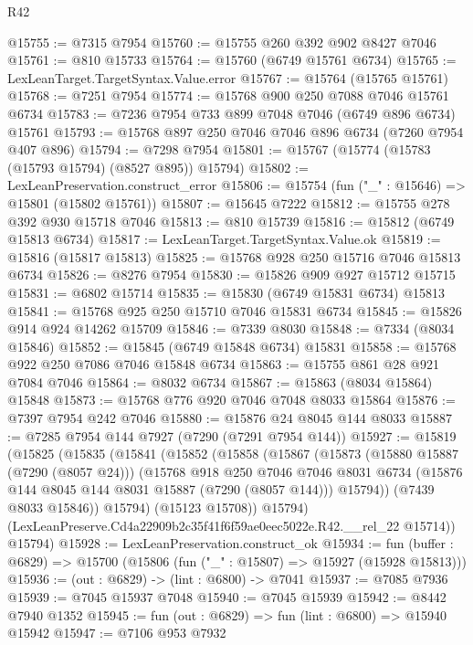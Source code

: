 \begin{lexlean}{R42}
\begin{coremodule}
{@15755 := @7315 @7954
@15760 := @15755 @260 @392 @902 @8427 @7046
@15761 := @810 @15733
@15764 := @15760 (@6749 @15761 @6734)
@15765 := LexLeanTarget.TargetSyntax.Value.error
@15767 := @15764 (@15765 @15761)
@15768 := @7251 @7954
@15774 := @15768 @900 @250 @7088 @7046 @15761 @6734
@15783 := @7236 @7954 @733 @899 @7048 @7046 (@6749 @896 @6734) @15761
@15793 := @15768 @897 @250 @7046 @7046 @896 @6734 (@7260 @7954 @407 @896)
@15794 := @7298 @7954
@15801 := @15767 (@15774 (@15783 (@15793 @15794) (@8527 @895)) @15794)
@15802 := LexLeanPreservation.construct_error
@15806 := @15754 (fun ("_" : @15646) => @15801 (@15802 @15761))
@15807 := @15645 @7222
@15812 := @15755 @278 @392 @930 @15718 @7046
@15813 := @810 @15739
@15816 := @15812 (@6749 @15813 @6734)
@15817 := LexLeanTarget.TargetSyntax.Value.ok
@15819 := @15816 (@15817 @15813)
@15825 := @15768 @928 @250 @15716 @7046 @15813 @6734
@15826 := @8276 @7954
@15830 := @15826 @909 @927 @15712 @15715
@15831 := @6802 @15714
@15835 := @15830 (@6749 @15831 @6734) @15813
@15841 := @15768 @925 @250 @15710 @7046 @15831 @6734
@15845 := @15826 @914 @924 @14262 @15709
@15846 := @7339 @8030
@15848 := @7334 (@8034 @15846)
@15852 := @15845 (@6749 @15848 @6734) @15831
@15858 := @15768 @922 @250 @7086 @7046 @15848 @6734
@15863 := @15755 @861 @28 @921 @7084 @7046
@15864 := @8032 @6734
@15867 := @15863 (@8034 @15864) @15848
@15873 := @15768 @776 @920 @7046 @7048 @8033 @15864
@15876 := @7397 @7954 @242 @7046
@15880 := @15876 @24 @8045 @144 @8033
@15887 := @7285 @7954 @144 @7927 (@7290 (@7291 @7954 @144))
@15927 := @15819
    (@15825
      (@15835
        (@15841
          (@15852
            (@15858
              (@15867
                (@15873
                  (@15880 @15887 (@7290 (@8057 @24)))
                  (@15768
                    @918
                    @250
                    @7046
                    @7046
                    @8031
                    @6734
                    (@15876 @144 @8045 @144 @8031 @15887 (@7290 (@8057 @144)))
                    @15794))
                (@7439 @8033 @15846))
              @15794)
            (@15123 @15708))
          @15794)
        (LexLeanPreserve.Cd4a22909b2c35f41f6f59ae0eec5022e.R42.__rel_22 @15714))
      @15794)
@15928 := LexLeanPreservation.construct_ok
@15934 := fun (buffer : @6829) => @15700 (@15806 (fun ("_" : @15807) => @15927 (@15928 @15813)))
@15936 := (out : @6829) -> (lint : @6800) -> @7041
@15937 := @7085 @7936
@15939 := @7045 @15937 @7048
@15940 := @7045 @15939
@15942 := @8442 @7940 @1352
@15945 := fun (out : @6829) => fun (lint : @6800) => @15940 @15942
@15947 := @7106 @953 @7932
}
\end{coremodule}
\end{lexlean}
